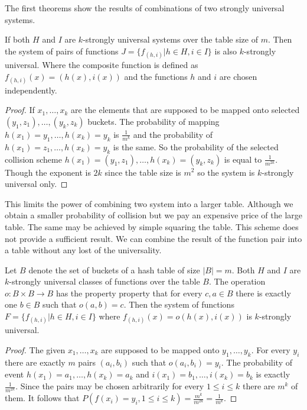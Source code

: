 The first theorems show the results of combinations of two strongly universal systems.
\begin{theorem}
If both $H$ and $I$ are $k$-strongly universal systems over the table size of $m$. Then the system of pairs of functions $J = \lbrace f_{(h, i)} | h \in H, i \in I \rbrace$ is also $k$-strongly universal. Where the composite function is defined as $f_{(h, i)}(x) = (h(x), i(x))$ and the functions $h$ and $i$ are chosen independently.
\end{theorem}
\begin{proof}
If $x_1, \dots, x_k$ are the elements that are supposed to be mapped onto selected $(y_1, z_1), \dots, (y_k, z_k)$ buckets. The probability of mapping $h(x_1) = y_1, \dots, h(x_k) = y_k$ is $\frac{1}{m^k}$ and the probability of $h(x_1) = z_1, \dots, h(x_k) = y_k$ is the same. So the probability of the selected collision scheme $h(x_1) = (y_1, z_1), \dots, h(x_k) = (y_k, z_k)$ is equal to $\frac{1}{m^{2k}}$. Though the exponent is $2k$ since the table size is $m^2$ so the system is $k$-strongly universal only.
\end{proof}

This limits the power of combining two system into a larger table. Although we obtain a smaller probability of collision but we pay an expensive price of the large table. The same may be achieved by simple squaring the table. This scheme does not provide a sufficient result. We can combine the result of the function pair into a table without any lost of the universality.
\begin{theorem}
Let $B$ denote the set of buckets of a hash table of size $|B| = m$. Both $H$ and $I$ are $k$-strongly universal classes of functions over the table $B$. The operation $o: B \times B \rightarrow B$ has the property property that for every $c, a \in B$ there is exactly one $b \in B$ such that $o(a, b) = c$. Then the system of functions $F = \lbrace f_{(h, i)} | h \in H, i \in I \rbrace$ where $f_{(h, i)}(x) = o(h(x), i(x))$ is $k$-strongly universal.
\end{theorem}
\begin{proof}
The given $x_1, \dots, x_k$ are supposed to be mapped onto $y_1, \dots, y_k$. For every $y_i$ there are exactly $m$ pairs $(a_i, b_i)$ such that $o(a_i, b_i) = y_i$. The probability of event $h(x_1) = a_1, \dots, h(x_k) = a_k$ and $i(x_1) = b_1, \dots, i(x_k) = b_k$ is exactly $\frac{1}{m^{2k}}$. Since the pairs may be chosen arbitrarily for every $1 \le i \le k$ there are $m^k$ of them. It follows that $P(f(x_i) = y_i, 1 \le i \le k) = \frac{m^k}{m^{2k}} = \frac{1}{m^k}$.
\end{proof}

